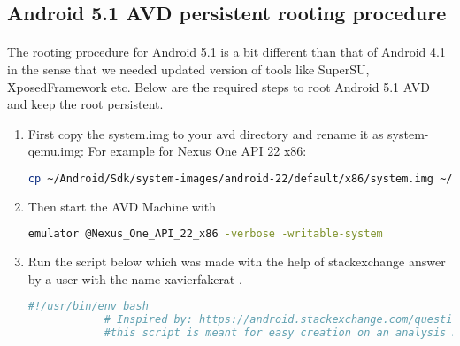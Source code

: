 \documentclass[../main.tex]{subfile}
\begin{document}
		\subsection{Android 5.1 AVD persistent rooting procedure} \label{sec:android_5.1_root}
		\paragraph{} The rooting procedure for Android 5.1 is a bit different than that of Android 4.1 in the sense that we needed updated version of tools like SuperSU, XposedFramework etc. Below are the required steps to root Android 5.1 AVD and keep the root persistent.
		\begin{enumerate}
			\item First copy the system.img to your avd directory and rename it as system-qemu.img: For example for Nexus One API 22 x86: \newline 
			\begin{lstlisting}[language=bash, numbers=none]
			cp ~/Android/Sdk/system-images/android-22/default/x86/system.img ~/.android/avd/Nexus_One_API_22_x86.avd/system-qemu.img
			\end{lstlisting}
						
			
			\item Then start the AVD Machine with \newline 
			\begin{lstlisting}[language=bash, numbers=none]
			emulator @Nexus_One_API_22_x86 -verbose -writable-system
			\end{lstlisting}
						
			
			\item Run the script below which was made with the help of stackexchange answer by a user with the name xavier\textunderscore fakerat \cite{android_emulator_7.1_root_stackexchange}.
			\begin{lstlisting}[language=bash]
			#!/usr/bin/env bash
			# Inspired by: https://android.stackexchange.com/questions/171442/root-android-virtual-device-with-android-7-1-1/176447
			#this script is meant for easy creation on an analysis machine for android emulator avd
			

\end{lstlisting}
\end{enumerate}
\end{document}
